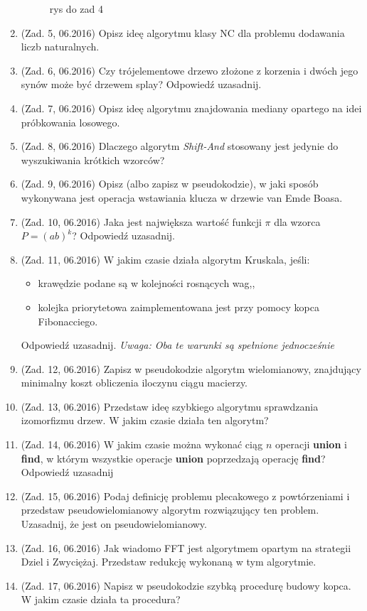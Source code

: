 \documentclass[10pt]{article}%
\begin{document}
\begin{enumerate}
\begin{figure}[H]
\caption{rys do zad 4}
\end{figure} 
\item (Zad. 5, 06.2016) Opisz ideę algorytmu klasy NC dla problemu dodawania liczb naturalnych.
\item (Zad. 6, 06.2016) Czy trójelementowe drzewo złożone z korzenia i dwóch jego synów może być drzewem splay? Odpowiedź uzasadnij.
\item (Zad. 7, 06.2016) Opisz ideę algorytmu znajdowania mediany opartego na idei próbkowania losowego.
\item (Zad. 8, 06.2016) Dlaczego algorytm \textit{Shift-And} stosowany jest jedynie do wyszukiwania krótkich wzorców?
\item (Zad. 9, 06.2016) Opisz (albo zapisz w pseudokodzie), w jaki sposób wykonywana jest operacja wstawiania klucza w drzewie van Emde Boasa.
\item (Zad. 10, 06.2016) Jaka jest największa wartość funkcji $\pi$ dla wzorca $ P = (ab)^k$? Odpowiedź uzasadnij.
\item (Zad. 11, 06.2016) W jakim czasie działa algorytm Kruskala, jeśli:
\begin{itemize}
\item krawędzie podane są w kolejności rosnących wag,,
\item kolejka priorytetowa zaimplementowana jest przy pomocy kopca Fibonacciego.
\end{itemize}
Odpowiedź uzasadnij. \textit{Uwaga: Oba te warunki są spełnione jednocześnie}
\item (Zad. 12, 06.2016) Zapisz w pseudokodzie algorytm wielomianowy, znajdujący minimalny koszt obliczenia iloczynu ciągu macierzy.
\item (Zad. 13, 06.2016) Przedstaw ideę szybkiego algorytmu sprawdzania izomorfizmu drzew. W jakim czasie działa ten algorytm?
\item (Zad. 14, 06.2016) W jakim czasie można wykonać ciąg $n$ operacji \textbf{union} i \textbf{find}, w którym wszystkie operacje \textbf{union} poprzedzają operację \textbf{find}? Odpowiedź uzasadnij 
\item (Zad. 15, 06.2016) Podaj definicję problemu plecakowego z powtórzeniami i przedstaw pseudowielomianowy algorytm rozwiązujący ten problem. Uzasadnij, że jest on pseudowielomianowy.
\item (Zad. 16, 06.2016) Jak wiadomo FFT jest algorytmem opartym na strategii Dziel i Zwyciężaj. Przedstaw redukcję wykonaną w tym algorytmie.
\item (Zad. 17, 06.2016) Napisz w pseudokodzie szybką procedurę budowy kopca. W jakim czasie działa ta procedura?

\end{enumerate}
\end{document}
